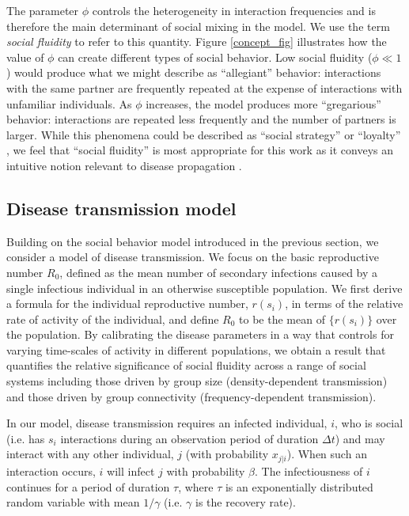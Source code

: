 \documentclass[twocolumn,8pt]{article}
\begin{document}
The parameter $\phi$ controls the heterogeneity in  interaction frequencies and is therefore the main determinant of social mixing in the model. We use the term \emph{social fluidity} to refer to this quantity. Figure \ref{concept_fig} illustrates how the value of $\phi$ can create different types of social behavior. Low social fluidity ($\phi\ll 1$) would produce what we might describe as ``allegiant'' behavior: interactions with the same partner are frequently repeated at the expense of interactions with unfamiliar individuals. As $\phi$ increases, the model produces more ``gregarious'' behavior: interactions are repeated less frequently and the number of partners is larger. While this phenomena could be described as  ``social strategy'' or ``loyalty'' \cite{10.1371/journal.pcbi.1004152,miritello2013limited}, we feel that ``social fluidity'' is most appropriate for this work as it conveys an intuitive notion relevant to disease propagation \cite{Reluga20141901}.

\subsection*{Disease transmission model}
\label{disease_section}
Building on the social behavior model introduced in the previous section, we consider a model of disease transmission. We focus on the basic reproductive number $R_{0}$, defined as the mean number of secondary infections caused by a single infectious individual in an otherwise susceptible population. We first derive a formula for the individual reproductive number, $r(s_{i})$, in terms of the relative rate of activity of the individual, and define $R_{0}$ to be the mean of $\{r(s_{i})\}$ over the population. By calibrating the disease parameters in a way that controls for varying time-scales of activity in different populations, we obtain a result that quantifies the relative significance of social fluidity across a range of social systems including those driven by group size (density-dependent transmission) and those driven by group connectivity (frequency-dependent transmission).  

In our model, disease transmission requires an infected individual, $i$, who is social (i.e. has $s_{i}$ interactions during an observation period of duration $\Delta t$) and may interact with any other individual, $j$ (with probability $x_{j|i}$). When such an interaction occurs, $i$ will infect $j$ with probability $\beta$. The infectiousness of $i$ continues for a period of duration $\tau$, where $\tau$ is an exponentially distributed random variable with mean $1/\gamma$ (i.e. $\gamma$ is the recovery rate).
\end{document}
